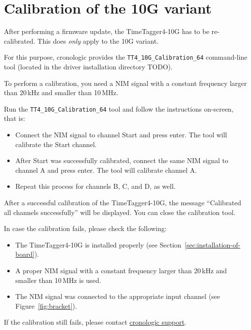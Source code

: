 \section{Calibration of the 10G variant}

After performing a firmware update, the TimeTagger4-10G has to be re-calibrated.
This does \emph{only} apply to the 10G variant.

For this purpose, cronologic provides the \texttt{TT4\_10G\_Calibration\_64} command-line tool (located in the driver installation directory TODO).

To perform a calibration, you need a NIM signal with a constant frequency larger than 20\,kHz and smaller than 10\,MHz.

Run the \texttt{TT4\_10G\_Calibration\_64} tool and follow the instructions on-screen, that is:

\begin{itemize}
    \item Connect the NIM signal to channel Start and press enter. The tool will calibrate the Start channel.
    \item After Start was successfully calibrated, connect the same NIM signal to channel A and press enter. The tool will calibrate channel A.
    \item Repeat this process for channels B, C, and D, as well.
\end{itemize}

After a successful calibration of the TimeTagger4-10G, the message ``Calibrated all channels successfully'' will be displayed.
You can close the calibration tool.

In case the calibration fails, please check the following:
\begin{itemize}
    \item The TimeTagger4-10G is installed properly (see Section~\ref{sec:installation-of-board}).
    \item A proper NIM signal with a constant frequency larger than 20\,kHz and smaller than 10\,MHz is used.
    \item The NIM signal was connected to the appropriate input channel (see Figure~\ref{fig:bracket}).
\end{itemize}

If the calibration still fails, please contact \href{https://www.cronologic.de/contact}{cronologic support}.
